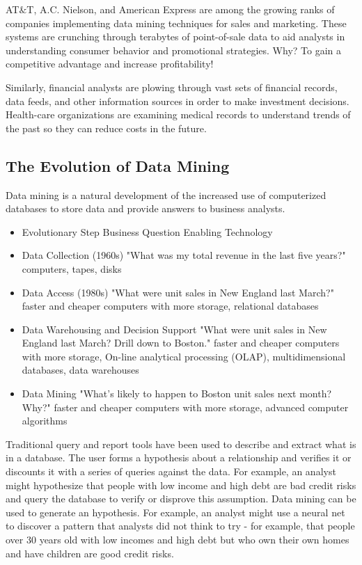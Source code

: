 AT$\&$T, A.C. Nielson, and American Express are among the growing ranks of companies implementing data mining techniques for sales and marketing. These systems are crunching through terabytes of point-of-sale data to aid analysts in understanding consumer behavior and promotional strategies. Why? To gain a competitive advantage and increase profitability!

Similarly, financial analysts are plowing through vast sets of financial records, data feeds, and other information sources in order to make investment decisions. Health-care organizations are examining medical records to understand trends of the past so they can reduce costs in the future.

\subsection{The Evolution of Data Mining}
Data mining is a natural development of the increased use of computerized databases to store data and provide answers to business analysts.

\begin{itemize}
\item Evolutionary Step
 Business Question
 Enabling Technology

\item  Data Collection (1960s)
 "What was my total revenue in the last five years?"
 computers, tapes, disks

\item  Data Access (1980s)
 "What were unit sales in New England last March?"
 faster and cheaper computers with more storage, relational databases

\item Data Warehousing and Decision Support
 "What were unit sales in New England last March? Drill down to Boston."
 faster and cheaper computers with more storage, On-line analytical processing (OLAP), multidimensional databases, data warehouses

\item Data Mining
 "What's likely to happen to Boston unit sales next month? Why?"
 faster and cheaper computers with more storage, advanced computer algorithms

\end{itemize}

Traditional query and report tools have been used to describe and extract what is in a database. The user forms a hypothesis about a relationship and verifies it or discounts it with a series of queries against the data. For example, an analyst might hypothesize that people with low income and high debt are bad credit risks and query the database to verify or disprove this assumption. Data mining can be used to generate an hypothesis. For example, an analyst might use a neural net to discover a pattern that analysts did not think to try - for example, that people over 30 years old with low incomes and high debt but who own their own homes and have children are good credit risks.

